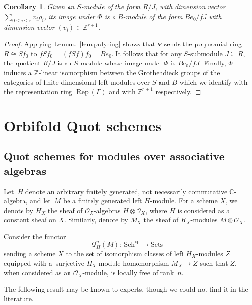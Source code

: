 \documentclass[10pt,a4paper]{amsart}
\newtheorem{Corollary}[Theorem]{Corollary}
\newcommand{\SC}{\mathbb{C}} %
\newcommand{\Rep}{\operatorname{Rep}}
\numberwithin{equation}{section}
\begin{document}
\begin{Corollary}\label{cor_fd}
Given an $S$-module of the form $R/J$, with dimension vector $\sum_{0\leq i\leq r} v_i \rho_i$, its image under $\Phi$ is a $B$-module of the form $B e_0/fJ$ with dimension vector $(v_i)\in\mathbb{Z}^{r+1}$.
\end{Corollary}
\begin{proof}
Applying Lemma~\ref{lem:polyring} shows that $\Phi$ sends the polynomial ring $R\cong Sf_0$ to $fSf_0 =(fSf)f_0 = Be_0$. It follows that for any
$S$-submodule
$J\subseteq R$, the quotient $R/J$ is an $S$-module whose image under $\Phi$ is $Be_0/fJ$. Finally, $\Phi$ induces a $\mathbb{Z}$-linear isomorphism between the Grothendieck groups of the categories of finite-dimensional left modules over $S$ and $B$ which we identify with the representation ring $\Rep(\Gamma)$ and with $\mathbb{Z}^{r+1}$ respectively.
\end{proof}


\section{Orbifold Quot schemes}\label{sec:quot}

\subsection{Quot schemes for modules over associative algebras}\label{sect:generalquot}

Let~$H$ denote an arbitrary finitely generated,
not necessarily commutative $\SC$-algebra, and let~$M$ be a finitely
generated left $H$-module.
For a scheme $X$, we denote by $H_{X}$ the sheaf of $\mathcal{O}_X$-algebras
$H \otimes \mathcal{O}_X$, where $H$ is considered as a constant sheaf on $X$. Similarly, denote by $M_{X}$ the sheaf of $H_{X}$-modules
$M \otimes \mathcal{O}_X$.

Consider the functor
\[
\mathcal{Q}^{n}_H(M)\colon \ \mathrm{Sch}^{\mathrm{op}} \to \mathrm{Sets} \]
sending a scheme $X$ to the set of isomorphism classes of left $H_{X}$-modules $Z$ equipped with a~surjective $H_{X}$-module homomorphism
$M_{X} \to Z$ such that $Z$,
when considered as an $\mathcal{O}_{X}$-module, is locally free of rank~$n$.

The following result may be known to experts, though we could not find it in the literature.
\end{document}
